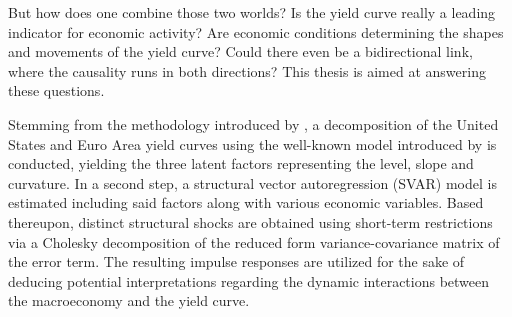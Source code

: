 But how does one combine those two worlds?
Is the yield curve really a leading indicator for economic activity?
Are economic conditions determining the shapes and movements of the yield curve?
Could there even be a bidirectional link, where the causality runs in both directions?
This thesis is aimed at answering these questions.

Stemming from the methodology introduced by \citet{diebold2006macroeconomy}, a decomposition of the United States and Euro Area yield curves using the well-known model introduced by \citet{nelson1987parsimonious} is conducted, yielding the three latent factors representing the level, slope and curvature.
In a second step, a structural vector autoregression (SVAR) model is estimated including said factors along with various economic variables.
Based thereupon, distinct structural shocks are obtained using short-term restrictions via a Cholesky decomposition of the reduced form variance-covariance matrix of the error term.
The resulting impulse responses are utilized for the sake of deducing potential interpretations regarding the dynamic interactions between the macroeconomy and the yield curve.

